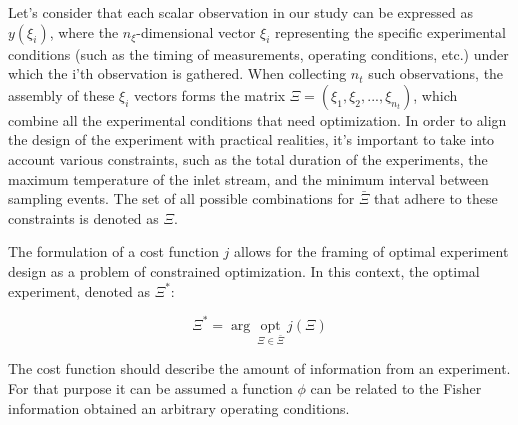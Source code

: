 \documentclass[]{scrartcl}
\begin{document}

Let's consider that each scalar observation in our study can be expressed as $y(\xi_i)$, where the $n_\xi$-dimensional vector $\xi_i$ representing the specific experimental conditions (such as the timing of measurements, operating conditions, etc.) under which the i'th observation is gathered. When collecting $n_t$ such observations, the assembly of these $\xi_i$ vectors forms the matrix $\Xi = (\xi_1, \xi_2,..., \xi_{n_t})$, which combine all the experimental conditions that need optimization. In order to align the design of the experiment with practical realities, it's important to take into account various constraints, such as the total duration of the experiments, the maximum temperature of the inlet stream, and the minimum interval between sampling events. The set of all possible combinations for $\bar{\Xi}$ that adhere to these constraints is denoted as $\Xi$.


The formulation of a cost function $j$ allows for the framing of optimal experiment design as a problem of constrained optimization. In this context, the optimal experiment, denoted as $\Xi^*$:

\begin{equation}
	\Xi^* = \arg~\underset{\Xi \in \bar{\Xi}}{\text{opt}}~j\left(\Xi\right)
\end{equation}

The cost function should describe the amount of information from an experiment. For that purpose it can be assumed a function $\phi$ can be related to the Fisher information obtained an arbitrary operating conditions.
\end{document}

